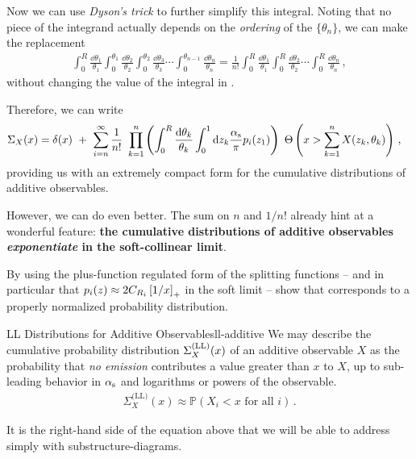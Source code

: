\begin{example}
    Now we can use \textit{Dyson's trick} to further simplify this integral.
    Noting that no piece of the integrand actually depends on the \textit{ordering} of the \(\{\theta_n\}\), we can make the replacement
    \begin{align}
        \int_0^R \frac{\dd\theta_1}{\theta_1}
        \int_0^{\theta_1} \frac{\dd\theta_2}{\theta_2}
        \int_0^{\theta_2} \frac{\dd\theta_3}{\theta_3}
        \cdots
        \int_0^{\theta_{n-1}} \frac{\dd\theta_n}{\theta_n}
        =
        \frac{1}{n!}
        \int_0^R \frac{\dd\theta_1}{\theta_1}
        \int_0^R \frac{\dd\theta_2}{\theta_2}
        \cdots
        \int_0^R \frac{\dd\theta_n}{\theta_n}
        \,,
    \end{align}
    without changing the value of the integral in .

    Therefore, we can write
    \begin{align}
        \label{eq:dysons-additive-cumulative-distribution}
        \Sigma_X(x)
        &=
        \delta(x)
        \,\,
        +
        \,\,
        \sum_{i = n}^\infty
        \frac{1}{n!}
        \,\,
        \prod_{k = 1}^n
        \le(
        \int_0^R \frac{\dd\theta_k}{\theta_k}
        \int_0^1 \dd z_k
        \frac{\alphas}{\pi}
        p_i(z_1)
        \ri)
        \,\,
        \Theta\le(x > \sum_{k = 1}^n X(z_k, \theta_k)\ri)
        \,,
    \end{align}
    providing us with an extremely compact form for the cumulative distributions of additive observables.

    However, we can do even better.
    The sum on \(n\) and \(1/n!\) already hint at a wonderful feature:
    \textbf{the cumulative distributions of additive observables \textit{exponentiate} in the soft-collinear limit}.
\end{example}

\begin{exercise}
    By using the plus-function regulated form of the splitting functions -- and in particular that \(p_i(z) \approx 2 C_{R_i} \left[1 / x\right]_+\) in the soft limit -- show that  corresponds to a properly normalized probability distribution.
\end{exercise}


\begin{proposition}{LL Distributions for Additive Observables}{ll-additive}
    We may describe the  cumulative probability distribution \(\Sigma^{\rm(LL)}_X(x)\) of an additive observable \(X\) as the probability that \textit{no emission} contributes a value greater than \(x\) to \(X\), up to sub-leading behavior in \(\alpha_{\mathrm{s}}\) and logarithms or powers of the observable.
    \begin{align}
        \label{eq:ll-additive}
        \Sigma^{\text{(LL)}}_X(x) \approx \mathbb{P}(X_i < x \text{ for all } i)
        \,.
    \end{align}

    It is the right-hand side of the equation above that we will be able to address simply with \glspl{substructure-diagram}.
\end{proposition}


